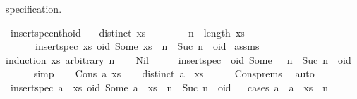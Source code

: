 \begin{isabellebody}
\begin{isamarkuptext}
specification.%
\end{isamarkuptext}\isamarkuptrue%
\isamarkupfalse%
\ insert{\isacharunderscore}spec{\isacharunderscore}nth{\isacharunderscore}oid{\isacharcolon}\isanewline
\ \ \ {\isachardoublequoteopen}distinct\ xs{\isachardoublequoteclose}\isanewline
\ \ \ \ \ \ \ \ {\isachardoublequoteopen}n\ {\isacharless}\ length\ xs{\isachardoublequoteclose}\isanewline
\ \ \ \ \ \ {\isachardoublequoteopen}insert{\isacharunderscore}spec\ xs\ {\isacharparenleft}oid{\isacharcomma}\ Some\ {\isacharparenleft}xs\ {\isacharbang}\ n{\isacharparenright}{\isacharparenright}\ {\isacharbang}\ Suc\ n\ {\isacharequal}\ oid{\isachardoublequoteclose}\isanewline
%
\isadelimproof
%
\endisadelimproof
%
\isatagproof
{}\isamarkupfalse%
\ assms\ \isamarkupfalse%
{\isacharparenleft}induction\ xs\ arbitrary{\isacharcolon}\ n{\isacharparenright}\isanewline
\ \ \isamarkupfalse%
\ Nil\isanewline
\ \ \isamarkupfalse%
\ \isamarkupfalse%
\ {\isachardoublequoteopen}insert{\isacharunderscore}spec\ {\isacharbrackleft}{\isacharbrackright}\ {\isacharparenleft}oid{\isacharcomma}\ Some\ {\isacharparenleft}{\isacharbrackleft}{\isacharbrackright}\ {\isacharbang}\ n{\isacharparenright}{\isacharparenright}\ {\isacharbang}\ Suc\ n\ {\isacharequal}\ oid{\isachardoublequoteclose}\isanewline
\ \ \ \ \isamarkupfalse%
\ simp\isanewline
{}\isamarkupfalse%
\isanewline
\ \ \isamarkupfalse%
\ {\isacharparenleft}Cons\ a\ xs{\isacharparenright}\isanewline
\ \ \isamarkupfalse%
\ {\isachardoublequoteopen}distinct\ {\isacharparenleft}a\ {\isacharhash}\ xs{\isacharparenright}{\isachardoublequoteclose}\isanewline
\ \ \ \ \isamarkupfalse%
\ Cons{\isachardot}prems{\isacharparenleft}{}{\isacharparenright}\ \isamarkupfalse%
\ auto\isanewline
\ \ \isamarkupfalse%
\ \isamarkupfalse%
\ {\isachardoublequoteopen}insert{\isacharunderscore}spec\ {\isacharparenleft}a\ {\isacharhash}\ xs{\isacharparenright}\ {\isacharparenleft}oid{\isacharcomma}\ Some\ {\isacharparenleft}{\isacharparenleft}a\ {\isacharhash}\ xs{\isacharparenright}\ {\isacharbang}\ n{\isacharparenright}{\isacharparenright}\ {\isacharbang}\ Suc\ n\ {\isacharequal}\ oid{\isachardoublequoteclose}\isanewline
\ \ \isamarkupfalse%
{\isacharparenleft}cases\ {\isachardoublequoteopen}a\ {\isacharequal}\ {\isacharparenleft}a\ {\isacharhash}\ xs{\isacharparenright}\ {\isacharbang}\ n{\isachardoublequoteclose}{\isacharparenright}\isanewline

\end{isabellebody}
